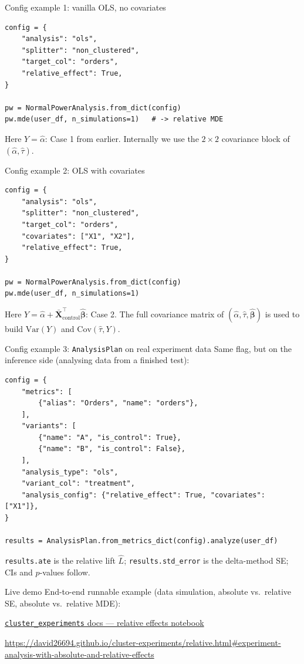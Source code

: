 \documentclass[10pt]{beamer}
\begin{document}
\begin{frame}[fragile]{Config example 1: vanilla OLS, no covariates}
\small
\begin{verbatim}
config = {
    "analysis": "ols",
    "splitter": "non_clustered",
    "target_col": "orders",
    "relative_effect": True,
}

pw = NormalPowerAnalysis.from_dict(config)
pw.mde(user_df, n_simulations=1)   # -> relative MDE
\end{verbatim}
Here $Y = \hat\alpha$: Case 1 from earlier. Internally we use the $2\times 2$ covariance block of $(\hat\alpha, \hat\tau)$.
\end{frame}

\begin{frame}[fragile]{Config example 2: OLS with covariates}
\small
\begin{verbatim}
config = {
    "analysis": "ols",
    "splitter": "non_clustered",
    "target_col": "orders",
    "covariates": ["X1", "X2"],
    "relative_effect": True,
}

pw = NormalPowerAnalysis.from_dict(config)
pw.mde(user_df, n_simulations=1)
\end{verbatim}
Here $Y = \hat\alpha + \bar{\mathbf{X}}_{\text{control}}^\top \hat{\bm\beta}$: Case 2. The full covariance matrix of $(\hat\alpha, \hat\tau, \hat{\bm\beta})$ is used to build $\mathrm{Var}(Y)$ and $\mathrm{Cov}(\hat\tau, Y)$.
\end{frame}

\begin{frame}[fragile]{Config example 3: \texttt{AnalysisPlan} on real experiment data}
\small
Same flag, but on the inference side (analysing data from a finished test):
\begin{verbatim}
config = {
    "metrics": [
        {"alias": "Orders", "name": "orders"},
    ],
    "variants": [
        {"name": "A", "is_control": True},
        {"name": "B", "is_control": False},
    ],
    "analysis_type": "ols",
    "variant_col": "treatment",
    "analysis_config": {"relative_effect": True, "covariates": ["X1"]},
}

results = AnalysisPlan.from_metrics_dict(config).analyze(user_df)
\end{verbatim}
\texttt{results.ate} is the relative lift $\hat L$; \texttt{results.std\_error} is the delta-method SE; CIs and $p$-values follow.
\end{frame}

\begin{frame}{Live demo}
End-to-end runnable example (data simulation, absolute vs.\ relative SE, absolute vs.\ relative MDE):
\begin{center}
\href{https://david26694.github.io/cluster-experiments/relative.html\#experiment-analysis-with-absolute-and-relative-effects}{\alert{\texttt{cluster\_experiments} docs --- relative effects notebook}}
\end{center}
\small
\url{https://david26694.github.io/cluster-experiments/relative.html#experiment-analysis-with-absolute-and-relative-effects}
\end{frame}
\end{document}
